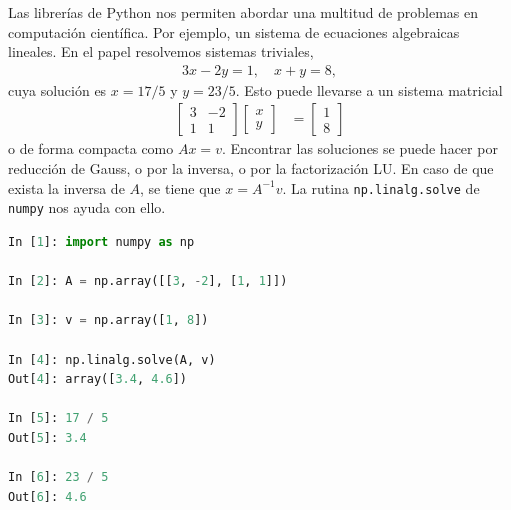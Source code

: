 \documentclass[12pt]{article}
\begin{document}
Las librerías de Python nos permiten abordar una multitud de problemas en 
computación científica. Por ejemplo, un sistema de ecuaciones algebraicas lineales.
En el papel resolvemos sistemas triviales, 
%
\begin{align*}
   3x - 2y = 1, \quad x + y = 8,
\end{align*}
%
cuya solución es $x = 17/5$ y $y = 23/5$. Esto puede llevarse a un sistema matricial 
%
\begin{align*}
   \begin{bmatrix}
      3 & -2 \\
      1 &  1
   \end{bmatrix}
   \begin{bmatrix}
      x \\
      y
   \end{bmatrix}
   &=
   \begin{bmatrix}
      1 \\
      8
   \end{bmatrix}
\end{align*}
%
o de forma compacta como $Ax = v$. Encontrar las soluciones se puede hacer por reducción 
de Gauss, o por la inversa, o por la factorización LU. 
En caso de que exista la inversa de $A$, se tiene que 
$x = A^{-1}v$. La rutina \lstinline|np.linalg.solve| de \lstinline|numpy| nos ayuda con ello.
%
\begin{lstlisting}[language=Python]
In [1]: import numpy as np

In [2]: A = np.array([[3, -2], [1, 1]])

In [3]: v = np.array([1, 8])

In [4]: np.linalg.solve(A, v)
Out[4]: array([3.4, 4.6])

In [5]: 17 / 5
Out[5]: 3.4

In [6]: 23 / 5
Out[6]: 4.6
\end{lstlisting}
%
 
\end{document}
